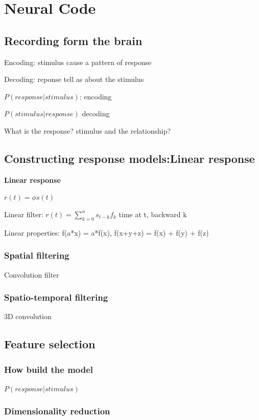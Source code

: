 \documentclass{book}
\begin{document}
\chapter{Neural Code}
\section{Recording form the brain}
Encoding: stimulus cause a pattern of response

Decoding: reponse tell as about the stimulus

$P(response | stimulus) $: encoding

$P(stimulus | response)$ decoding

What is the response? stimulus and the relationship?

\section{Constructing response models:Linear response}

\textbf{Linear response }

$r(t) = \phi s(t)$

Linear filter:  $r(t) = \sum_{k=0}^{n} s_{t-k} f_k$ time at t, backward k

Linear properties: f(a*x) = a*f(x), f(x+y+z) = f(x) + f(y) + f(z)

\subsection{Spatial filtering}

Convolution filter

\subsection{Spatio-temporal filtering}

3D convolution 

\section{Feature selection}

\subsection{How build the model}

$P(response|stimulus)$ 

\subsection{Dimensionality reduction}
\end{document}
